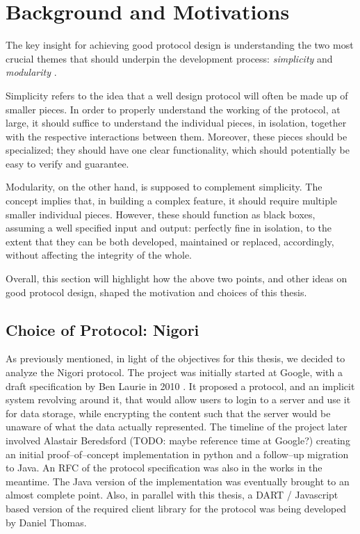\chapter{Background and Motivations} \label{chapter:background}
The key insight for achieving good protocol design is understanding the two most crucial themes that should underpin the development process: \textit{simplicity} and \textit{modularity} \cite{ProtocolDesign}.

Simplicity refers to the idea that a well design protocol will often be made up of smaller pieces. In order to properly understand the working of the protocol, at large, it should suffice to understand the individual pieces, in isolation, together with the respective interactions between them. Moreover, these pieces should be specialized; they should have one clear functionality, which should potentially be easy to verify and guarantee.

Modularity, on the other hand, is supposed to complement simplicity. The concept implies that, in building a complex feature, it should require multiple smaller individual pieces. However, these should function as black boxes, assuming a well specified input and output: perfectly fine in isolation, to the extent that they can be both developed, maintained or replaced, accordingly, without affecting the integrity of the whole.

Overall, this section will highlight how the above two points, and other ideas on good protocol design, shaped the motivation and choices of this thesis.

\section{Choice of Protocol: Nigori}
As previously mentioned, in light of the objectives for this thesis, we decided to analyze the Nigori protocol.
The project was initially started at Google, with a draft specification by Ben Laurie in 2010 \cite{NigoriDraft}.
It proposed a protocol, and an implicit system revolving around it, that would allow users to login to a server and use it for data storage, while encrypting the content such that the server would be unaware of what the data actually represented.
The timeline of the project later involved Alastair Beredsford (TODO: maybe reference time at Google?) creating an initial proof--of--concept implementation in python and a follow--up migration to Java.
An RFC \cite{NigoriRFC} of the protocol specification was also in the works in the meantime.
The Java version of the implementation was eventually brought to an almost complete point.
Also, in parallel with this thesis, a DART \cite{DART} / Javascript based version of the required client library for the protocol was being developed by Daniel Thomas.

